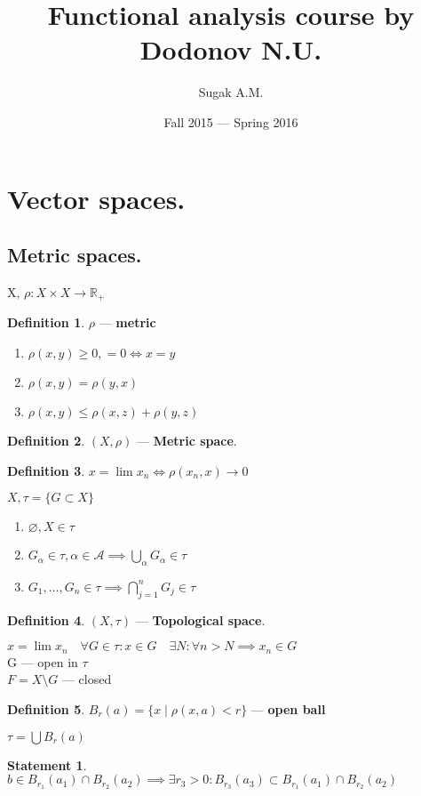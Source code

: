 \documentclass[12pt, fleqn]{article}
\author{Sugak A.M.}
\title{Functional analysis course by Dodonov N.U.}
\date{Fall 2015 --- Spring 2016}
\theoremstyle{definition}
\newtheorem*{defn}{Definition}
\theoremstyle{break}
\theoremstyle{theorem}
\newtheorem{stm}{Statement}[section]
\renewcommand\leq{\leqslant}
\renewcommand\geq{\geqslant}
\newcommand{\R}{\mathbb{R}}
\begin{document}
\maketitle
\newpage
\section{Vector spaces.}
\subsection{Metric spaces.}

X, $\rho\colon X \times X \to \R_+$
\begin{defn}$\rho$ --- \textbf{metric}
  \begin{enumerate} 
    \item $\rho(x, y) \geq 0, = 0 \iff x = y$
    \item $\rho(x, y) = \rho (y, x)$
    \item $\rho(x, y) \leq \rho (x, z) + \rho (y, z)$
  \end{enumerate}
\end{defn}
\begin{defn}$(X, \rho)$ --- \textbf{Metric space}.\end{defn}
\begin{defn}$x = \lim x_{n} \iff \rho(x_{n}, x) \rightarrow 0$\end{defn}
\vspace{5mm}
$X, \tau = \{G \subset X\}$
\begin{enumerate}
  \item $\varnothing, X \in \tau$
  \item $G_\alpha \in \tau, \alpha \in \mathscr{A} \implies \bigcup\limits_\alpha G_\alpha \in \tau$
  \item $G_1, \dotsc, G_n \in \tau \implies \bigcap\limits_{j = 1}^n G_j \in \tau$
\end{enumerate}
\begin{defn}$(X, \tau)$ --- \textbf{Topological space}.\end{defn}
$x = \lim x_n \quad \forall G \in \tau: x \in G \quad \exists N: \forall n > N \implies x_n \in G$\\
G --- open in $\tau$ \\
$F = X \setminus G$ --- closed
\begin{defn}
  $B_r (a) = \{x\mid \rho(x, a) < r\}$ --- \textbf{open ball}
\end{defn}
\noindent
$\tau = \bigcup B_r (a)$
\begin{stm}
  $b \in B_{r_1} (a_1) \cap B_{r_2} (a_2) \implies \exists r_3 > 0: B_{r_3}
  (a_3) \subset B_{r_1} (a_1) \cap B_{r_2} (a_2)$
\end{stm}
\end{document}
